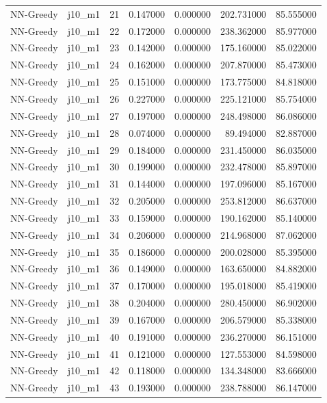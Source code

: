 \begin{tabular}{llrrrrr}
NN-Greedy & j10_m1 & 21 & 0.147000 & 0.000000 & 202.731000 & 85.555000 \\
NN-Greedy & j10_m1 & 22 & 0.172000 & 0.000000 & 238.362000 & 85.977000 \\
NN-Greedy & j10_m1 & 23 & 0.142000 & 0.000000 & 175.160000 & 85.022000 \\
NN-Greedy & j10_m1 & 24 & 0.162000 & 0.000000 & 207.870000 & 85.473000 \\
NN-Greedy & j10_m1 & 25 & 0.151000 & 0.000000 & 173.775000 & 84.818000 \\
NN-Greedy & j10_m1 & 26 & 0.227000 & 0.000000 & 225.121000 & 85.754000 \\
NN-Greedy & j10_m1 & 27 & 0.197000 & 0.000000 & 248.498000 & 86.086000 \\
NN-Greedy & j10_m1 & 28 & 0.074000 & 0.000000 & 89.494000 & 82.887000 \\
NN-Greedy & j10_m1 & 29 & 0.184000 & 0.000000 & 231.450000 & 86.035000 \\
NN-Greedy & j10_m1 & 30 & 0.199000 & 0.000000 & 232.478000 & 85.897000 \\
NN-Greedy & j10_m1 & 31 & 0.144000 & 0.000000 & 197.096000 & 85.167000 \\
NN-Greedy & j10_m1 & 32 & 0.205000 & 0.000000 & 253.812000 & 86.637000 \\
NN-Greedy & j10_m1 & 33 & 0.159000 & 0.000000 & 190.162000 & 85.140000 \\
NN-Greedy & j10_m1 & 34 & 0.206000 & 0.000000 & 214.968000 & 87.062000 \\
NN-Greedy & j10_m1 & 35 & 0.186000 & 0.000000 & 200.028000 & 85.395000 \\
NN-Greedy & j10_m1 & 36 & 0.149000 & 0.000000 & 163.650000 & 84.882000 \\
NN-Greedy & j10_m1 & 37 & 0.170000 & 0.000000 & 195.018000 & 85.419000 \\
NN-Greedy & j10_m1 & 38 & 0.204000 & 0.000000 & 280.450000 & 86.902000 \\
NN-Greedy & j10_m1 & 39 & 0.167000 & 0.000000 & 206.579000 & 85.338000 \\
NN-Greedy & j10_m1 & 40 & 0.191000 & 0.000000 & 236.270000 & 86.151000 \\
NN-Greedy & j10_m1 & 41 & 0.121000 & 0.000000 & 127.553000 & 84.598000 \\
NN-Greedy & j10_m1 & 42 & 0.118000 & 0.000000 & 134.348000 & 83.666000 \\
NN-Greedy & j10_m1 & 43 & 0.193000 & 0.000000 & 238.788000 & 86.147000 \\

\end{tabular}
